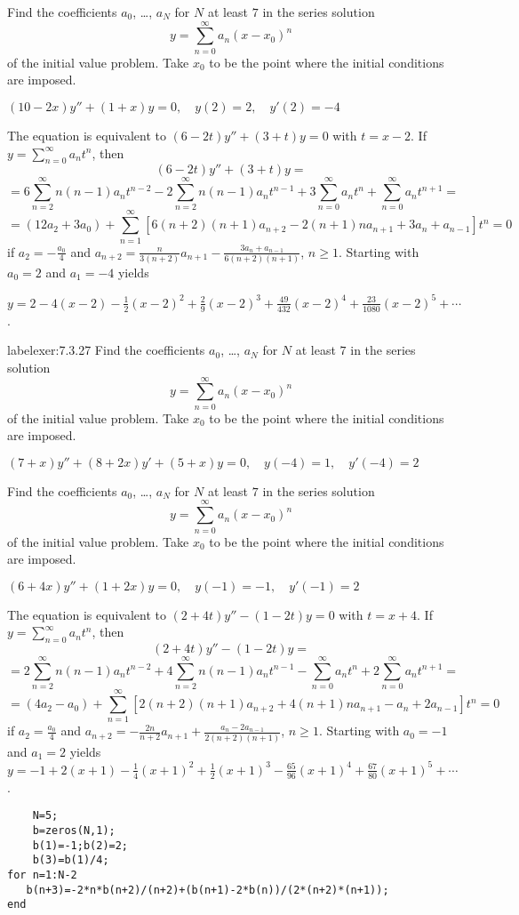 \documentclass{ximera}
\begin{document}
\begin{problem}\label{exer:7.3.26}
Find
the coefficients  $a_0$, \dots, $a_N$  for $N$ at least $7$
in the series solution
$$
y=\sum_{n=0}^\infty a_n(x-x_0)^n
$$
of the
initial value problem. Take $x_0$ to be the point where the initial
conditions are imposed.

$(10-2x)y''+(1+x)y=0,\quad y(2)=2,\quad y'(2)=-4$

\begin{solution}
     The equation is equivalent to
 $(6-2t)y''+(3+t)y=0$ with $t=x-2$.
If $y=\sum_{n=0}^\infty a_nt^n$, then
$$(6-2t)y''+(3+t)y=$$
$$=6\sum_{n=2}^\infty n(n-1)a_nt^{n-2}
-2\sum_{n=2}^\infty n(n-1)a_nt^{n-1}
+3\sum_{n=0}^\infty a_nt^n
+\sum_{n=0}^\infty a_nt^{n+1}=$$
$$=(12a_2+3a_0)+
\sum_{n=1}^\infty[6(n+2)(n+1)a_{n+2}-2(n+1)na_{n+1}+3a_n
+a_{n-1}]t^n=0$$  if $a_2=-\frac{a_0}{4}$ and
$a_{n+2}=\frac{n}{3(n+2)}a_{n+1}-\frac{3a_n+a_{n-1}}{6(n+2)(n+1)}$,
$n\geq 1$. Starting with $a_0=2$ and $a_1=-4$ yields

$y=2-4(x-2)-\frac{1}{2}(x-2)^2+\frac{2}{9}(x-2)^3+\frac{49}{432}(x-2)^4
+\frac{23}{1080}(x-2)^5+\cdots$.
\end{solution}
\end{problem}

\begin{problem}label{exer:7.3.27}
Find
the coefficients  $a_0$, \dots, $a_N$  for $N$ at least $7$
in the series solution
$$
y=\sum_{n=0}^\infty a_n(x-x_0)^n
$$
of the
initial value problem. Take $x_0$ to be the point where the initial
conditions are imposed.

$(7+x)y''+(8+2x)y'+(5+x)y=0,\quad y(-4)=1,\quad y'(-4)=2$
\end{problem}

\begin{problem}\label{exer:7.3.28}
Find
the coefficients  $a_0$, \dots, $a_N$  for $N$ at least $7$
in the series solution
$$
y=\sum_{n=0}^\infty a_n(x-x_0)^n
$$
of the
initial value problem. Take $x_0$ to be the point where the initial
conditions are imposed.

$(6+4x)y''+(1+2x)y=0,\quad y(-1)=-1,\quad y'(-1)=2$

\begin{solution}
    The equation is equivalent to
 $(2+4t)y''-(1-2t)y=0$ with $t=x+4$.
If $y=\sum_{n=0}^\infty a_nt^n$, then
$$(2+4t)y''-(1-2t)y=$$
$$=2\sum_{n=2}^\infty n(n-1)a_nt^{n-2}
+4\sum_{n=2}^\infty n(n-1)a_nt^{n-1}
-\sum_{n=0}^\infty a_nt^n
+2\sum_{n=0}^\infty a_nt^{n+1}=$$
$$=(4a_2-a_0)+
\sum_{n=1}^\infty[2(n+2)(n+1)a_{n+2}+4(n+1)na_{n+1}
-a_n+2a_{n-1}]t^n=0$$  if $a_2=\frac{a_0}{4}$ and
$a_{n+2}=-\frac{2n}{
n+2}a_{n+1}+\frac{a_n-2a_{n-1}}{2(n+2)(n+1)}$,
$n\ge1$. Starting with $a_0=-1$ and $a_1=2$ yields
$y=-1+2(x+1)-\frac{1}{4}(x+1)^2+\frac{1}{2}(x+1)^3-\frac{65}{96}(x+1)^4
+\frac{67}{80}(x+1)^5+\cdots$.

\begin{verbatim}
    N=5; 
    b=zeros(N,1); 
    b(1)=-1;b(2)=2; 
    b(3)=b(1)/4;
for n=1:N-2
   b(n+3)=-2*n*b(n+2)/(n+2)+(b(n+1)-2*b(n))/(2*(n+2)*(n+1));
end
\end{verbatim}
\end{solution}
\end{problem}
\end{document}
